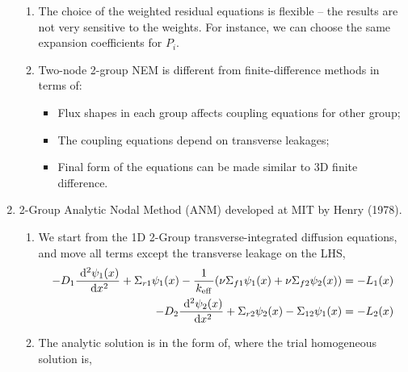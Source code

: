 \documentclass{school-22.211-notes}
\begin{document}
\begin{enumerate}
\begin{enumerate}
  \item The choice of the weighted residual equations is flexible -- the results are not very sensitive to the weights. For instance, we can choose the same expansion coefficients for $P_i$. 

  \item Two-node 2-group NEM is different from finite-difference methods in terms of: 
    \begin{itemize}
      \item Flux shapes in each group affects coupling equations for other group;
      \item The coupling equations depend on transverse leakages;
      \item Final form of the equations can be made similar to 3D finite difference. 
    \end{itemize}
  \end{enumerate}


\clearpage
\item 2-Group Analytic Nodal Method (ANM) developed at MIT by Henry (1978). 
  \begin{enumerate}
  \item We start from the 1D 2-Group transverse-integrated diffusion equations, and move all terms except the transverse leakage on the LHS, 
    \begin{align}
      -D_1 \frac{\mbox{ }\mathrm{d}^2 \psi_1(x)}{\mbox{ }\mathrm{d} x^2} + \Sigma_{r1} \psi_1(x) - \frac{1}{\left. k_{\mathrm{eff}} \right.} (\nu \Sigma_{f1} \psi_1 (x) + \nu \Sigma_{f2} \psi_2 (x) ) &= - L_1(x) \\
      -D_2 \frac{\mbox{ }\mathrm{d}^2 \psi_2(x)}{\mbox{ }\mathrm{d} x^2} + \Sigma_{r2} \psi_2(x) - \Sigma_{12} \psi_1 (x) &= - L_2 (x) 
    \end{align}

  \item The analytic solution is in the form of, 
    where the trial homogeneous solution is, 
   

\end{enumerate}
\end{enumerate}
\end{document}
